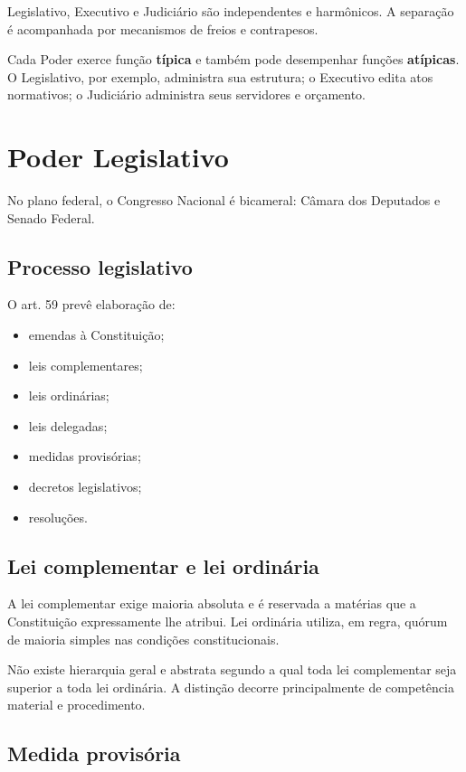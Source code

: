 Legislativo, Executivo e Judiciário são independentes e harmônicos. A separação é acompanhada por mecanismos de freios e contrapesos.

Cada Poder exerce função \textbf{típica} e também pode desempenhar funções \textbf{atípicas}. O Legislativo, por exemplo, administra sua estrutura; o Executivo edita atos normativos; o Judiciário administra seus servidores e orçamento.

\section{Poder Legislativo}

No plano federal, o Congresso Nacional é bicameral: Câmara dos Deputados e Senado Federal.

\subsection{Processo legislativo}

O art. 59 prevê elaboração de:
\begin{itemize}
\item emendas à Constituição;
\item leis complementares;
\item leis ordinárias;
\item leis delegadas;
\item medidas provisórias;
\item decretos legislativos;
\item resoluções.
\end{itemize}

\subsection{Lei complementar e lei ordinária}

A lei complementar exige maioria absoluta e é reservada a matérias que a Constituição expressamente lhe atribui. Lei ordinária utiliza, em regra, quórum de maioria simples nas condições constitucionais.

Não existe hierarquia geral e abstrata segundo a qual toda lei complementar seja superior a toda lei ordinária. A distinção decorre principalmente de competência material e procedimento.

\subsection{Medida provisória}

